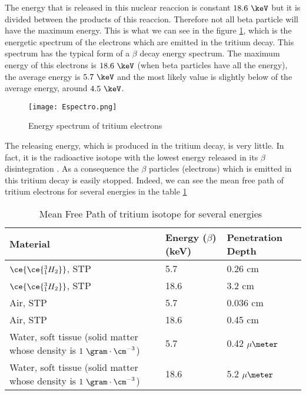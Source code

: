 The energy that is released in this nuclear reaccion is constant $18.6~\keV$ but it is divided between the products of this reaccion. Therefore not all beta particle will have the maximum energy. This is what we can see in the figure \ref{fig:TritiumDecaySpectrum}, which is the energetic spectrum of the electrons which are emitted in the tritium decay. This spectrum has the typical form of a $\beta$ decay energy spectrum. The maximum energy of this electrons is $18.6~\keV$ (when beta particles have all the energy), the average energy is $5.7~\keV$ and the most likely value is slightly below of the average energy, around $4.5~\keV$.

\begin{figure}[hbtp]
\texttt{[image: Espectro.png]}
\centering
\caption{Energy spectrum of tritium electrons ~\cite{TesisTritio}\label{fig:TritiumDecaySpectrum}}
\end{figure}


The releasing energy, which is produced in the tritium decay, is very little. In fact, it is the radioactive isotope with the lowest energy released in its $\beta$ disintegration \cite{dOCUMENTO MANIPULACIÓN SEGURA DEL TRITIO}. As a consequence the $\beta$ particles (electrons) which is emitted in this tritium decay is easily stopped. Indeed, we can see the mean free path of tritium electrons for several energies in the table \ref{MeanFreePathTritium}

\begin{table}[htbp]
\begin{center}
\begin{tabular}{|l|l|l|}
\hline
Material & Energy ($\beta$)(keV) & Penetration Depth \\
\hline \hline \hline
$\ce{\ce{^{3}_{1}H_2}}$, STP & 5.7 & 0.26 cm \\ \hline
$\ce{\ce{^{3}_{1}H_2}}$, STP & 18.6 & 3.2 cm \\ \hline
Air, STP & 5.7 & 0.036 cm \\ \hline
Air, STP & 18.6 & 0.45 cm \\ \hline
\parbox{10em}{\centering Water, soft tissue\\  (solid matter whose \\  density is $1~\gram\cdot\cm^{-3}$)} & 5.7 & 0.42 $\mu\meter$\\ \hline
\parbox{10em}{\centering Water, soft tissue\\  (solid matter whose \\  density is $1~\gram\cdot\cm^{-3}$)} & 18.6 & 5.2 $\mu\meter$ \\ \hline
\end{tabular}
\caption{Mean Free Path of tritium isotope for several energies~\cite{documento manipulación segura tritio}}
\label{MeanFreePathTritium}
\end{center}
\end{table}

